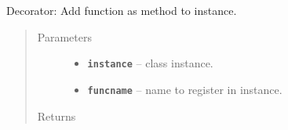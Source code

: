 \documentclass[letterpaper,10pt,english]{sphinxmanual}
\begin{document}
\begin{fulllineitems}
\label{RRtoolbox.lib:RRtoolbox.lib.root.addto}
Decorator: Add function as method to instance.
\begin{quote}\begin{description}
\item[{Parameters}] \leavevmode\begin{itemize}
\item {} 
\textbf{\texttt{instance}} -- class instance.

\item {} 
\textbf{\texttt{funcname}} -- name to register in instance.

\end{itemize}

\item[{Returns}] \leavevmode


\end{description}\end{quote}

\end{fulllineitems}

\end{document}
